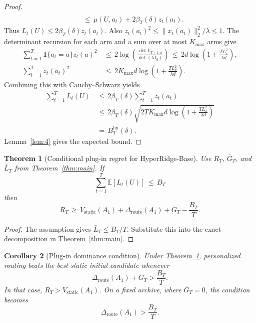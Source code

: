 \documentclass{article} %
\newtheorem{theorem}{Theorem}
\newtheorem{corollary}[theorem]{Corollary}
\begin{document}
\begin{proof}
\begin{equation}
\begin{aligned}
\\
&\,\leq\,
\mu(U,a_t)
+
2\beta_T(\delta)z_t(a_t).
\end{aligned}
\end{equation}
Thus \(L_t(U)\leq2\beta_T(\delta)z_t(a_t)\).  Also
\(z_t(a_t)^2\leq\|x_t(a_t)\|_2^2/\lambda\leq1\).  The determinant recursion
for each arm and a sum over at most \(K_{\max}\) arms give
\begin{equation}
\begin{aligned}
\sum_{t=1}^{T}
\mathbf{1}\{a_t=a\}z_t(a)^2
&\,\leq\,
2
\log\!\left(
\frac{\det V_{T+1,a}}{\det(\lambda I_d)}
\right)
\,\leq\,
2d
\log\!\left(1+\frac{T L_x^2}{\lambda d}\right), \\
\sum_{t=1}^{T}z_t(a_t)^2
&\,\leq\,
2K_{\max}d
\log\!\left(1+\frac{T L_x^2}{\lambda d}\right).
\end{aligned}
\end{equation}
Combining this with Cauchy--Schwarz yields
\begin{equation}
\begin{aligned}
\sum_{t=1}^{T}L_t(U)
&\,\leq\,
2\beta_T(\delta)
\sum_{t=1}^{T}z_t(a_t)
\\
&\,\leq\,
2\beta_T(\delta)
\sqrt{
2T K_{\max}d
\log\!\left(1+\frac{T L_x^2}{\lambda d}\right)
}
\\
&\,=\,
B_T^{\mathrm{lin}}(\delta).
\end{aligned}
\end{equation}
Lemma~\ref{lem:4} gives the expected bound.
\end{proof}

\begin{theorem}[Conditional plug-in regret for HyperRidge-Base]
\label{thm:convergence}
Use \(R_T\), \(\bar G_T\), and \(\bar L_T\) from
Theorem~\ref{thm:main}.  If
\begin{equation}
\label{eq:app-plugin-tax-assumption}
\sum_{t=1}^{T}\mathbb{E}[L_t(U)]
\,\leq\,
B_T
\end{equation}
then
\begin{equation}
R_T
\,\geq\,
V_{\mathrm{static}}(A_1)
+
\Delta_{\mathrm{route}}(A_1)
+
\bar G_T
-
\frac{B_T}{T}.
\end{equation}
\end{theorem}

\begin{proof}
The assumption gives \(\bar L_T\leq B_T/T\).  Substitute this into the exact
decomposition in Theorem~\ref{thm:main}.
\end{proof}

\begin{corollary}[Plug-in dominance condition]
\label{cor:app-plugin-dominance}
Under Theorem~\ref{thm:convergence}, personalized routing beats the best
static initial candidate whenever
\begin{equation}
\Delta_{\mathrm{route}}(A_1)
+
\bar G_T
>
\frac{B_T}{T}.
\end{equation}
In that case, \(R_T>V_{\mathrm{static}}(A_1)\).  On a fixed archive, where
\(\bar G_T=0\), the condition becomes
\begin{equation}
\Delta_{\mathrm{route}}(A_1)
>
\frac{B_T}{T}.
\end{equation}
\end{corollary}
\end{document}
